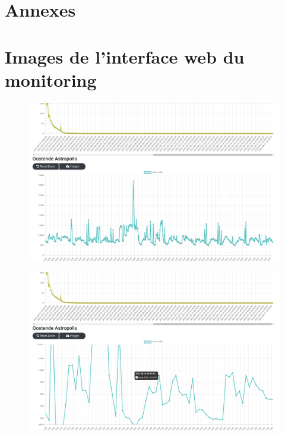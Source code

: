 \documentclass[11pt]{article}
\begin{document}
\newpage

\section{Annexes}

\appendix

\section{Images de l'interface web du monitoring} \label{app:monitoring-ui}

\begin{figure}[H]
    \begin{center}
        \includegraphics[scale=0.21]{Screenshot from 2022-08-22 10-49-20.png}
    \end{center}
\end{figure}

\begin{figure}[H]
    \begin{center}
        \includegraphics[scale=0.21]{Screenshot from 2022-08-22 10-49-34.png}
    \end{center}
\end{figure}
\end{document}
